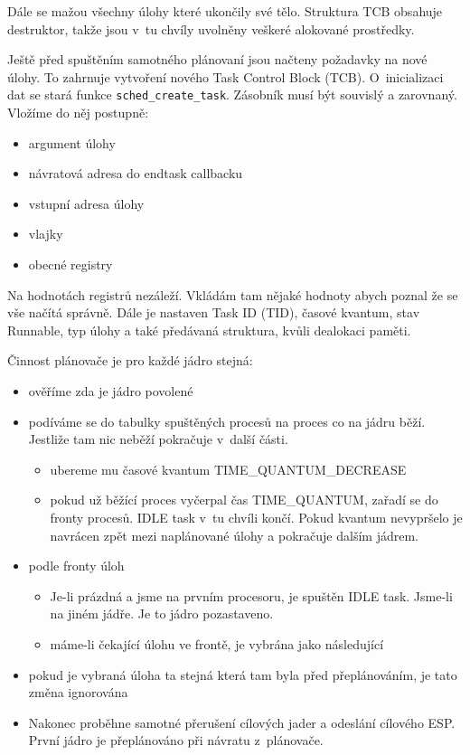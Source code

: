 \documentclass[a4paper,12pt]{article}
\begin{document}
Dále se mažou všechny úlohy které ukončily své tělo. Struktura TCB obsahuje destruktor,
takže jsou v~tu chvíly uvolněny veškeré alokované prostředky.

Ještě před spuštěním samotného plánovaní jsou načteny požadavky na nové úlohy. To zahrnuje
vytvoření nového Task Control Block (TCB). O~inicializaci dat se stará funkce
\verb+sched_create_task+. Zásobník musí být souvislý a zarovnaný. Vložíme do něj postupně:

\begin{itemize}
\item argument úlohy
\item návratová adresa do endtask callbacku
\item vstupní adresa úlohy
\item vlajky
\item obecné registry
\end{itemize}

Na hodnotách registrů nezáleží. Vkládám tam nějaké hodnoty abych poznal že
se vše načítá správně. Dále je nastaven Task ID (TID), časové kvantum, stav Runnable,
typ úlohy a také předávaná struktura, kvůli dealokaci paměti.

Činnost plánovače je pro každé jádro stejná:

\begin{itemize}
\item ověříme zda je jádro povolené
\item podíváme se do tabulky spuštěných procesů na proces co na jádru běží. Jestliže tam nic neběží
pokračuje v~další části.
\begin{itemize}
\item ubereme mu časové kvantum TIME\_QUANTUM\_DECREASE
\item pokud už běžící proces vyčerpal čas TIME\_QUANTUM, zařadí se do fronty procesů.
IDLE task v~tu chvíli končí. Pokud kvantum nevypršelo je navrácen zpět mezi naplánované úlohy a pokračuje
dalším jádrem.
\end{itemize}
\item podle fronty úloh
\begin{itemize}
\item Je-li prázdná a jsme na prvním procesoru, je spuštěn IDLE task. Jsme-li na jiném jádře. Je to
jádro pozastaveno.
\item máme-li čekající úlohu ve frontě, je vybrána jako následující
\end{itemize}
\item pokud je vybraná úloha ta stejná která tam byla před přeplánováním, je tato změna ignorována
\item Nakonec proběhne samotné přerušení cílových jader a odeslání cílového ESP. První jádro je
přeplánováno při návratu z~plánovače.
\end{itemize}
\end{document}

